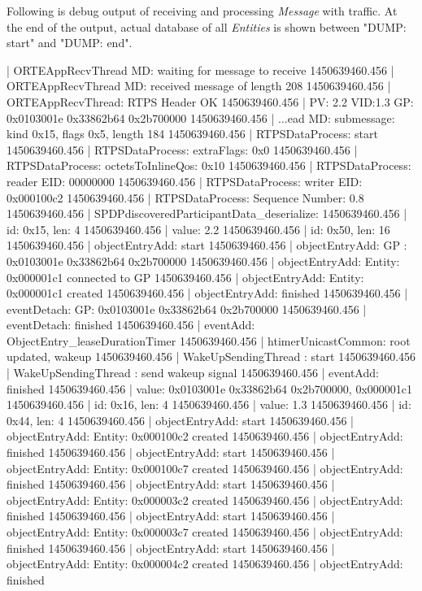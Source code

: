 Following is debug output of receiving and processing  {\em Message} with  traffic. At the end of the output, actual database of all {\em Entities} is shown between "DUMP: start" and "DUMP: end".

 | ORTEAppRecvThread MD: waiting for message to receive
1450639460.456 | ORTEAppRecvThread MD: received message of length 208
1450639460.456 | ORTEAppRecvThread: RTPS Header OK
1450639460.456 |   PV: 2.2 VID:1.3 GP: 0x0103001e 0x33862b64 0x2b700000
1450639460.456 | ...ead MD: submessage: kind 0x15, flags 0x5, length 184
1450639460.456 | RTPSDataProcess: start
1450639460.456 | RTPSDataProcess: extraFlags: 0x0
1450639460.456 | RTPSDataProcess: octetsToInlineQos: 0x10
1450639460.456 | RTPSDataProcess: reader EID:   00000000
1450639460.456 | RTPSDataProcess: writer EID: 0x000100c2
1450639460.456 | RTPSDataProcess: Sequence Number: 0.8
1450639460.456 | SPDPdiscoveredParticipantData_deserialize:
1450639460.456 |   id: 0x15, len: 4
1450639460.456 |   value: 2.2
1450639460.456 |   id: 0x50, len: 16
1450639460.456 | objectEntryAdd: start
1450639460.456 | objectEntryAdd: GP  : 0x0103001e 0x33862b64 0x2b700000
1450639460.456 | objectEntryAdd: Entity: 0x000001c1 connected to GP
1450639460.456 | objectEntryAdd: Entity: 0x000001c1 created
1450639460.456 | objectEntryAdd: finished
1450639460.456 | eventDetach: GP: 0x0103001e 0x33862b64 0x2b700000
1450639460.456 | eventDetach: finished
1450639460.456 | eventAdd: ObjectEntry_leaseDurationTimer
1450639460.456 | htimerUnicastCommon: root updated, wakeup
1450639460.456 | WakeUpSendingThread : start
1450639460.456 | WakeUpSendingThread : send wakeup signal
1450639460.456 | eventAdd: finished
1450639460.456 |   value: 0x0103001e 0x33862b64 0x2b700000, 0x000001c1
1450639460.456 |   id: 0x16, len: 4
1450639460.456 |   value: 1.3
1450639460.456 |   id: 0x44, len: 4
1450639460.456 | objectEntryAdd: start
1450639460.456 | objectEntryAdd: Entity: 0x000100c2 created
1450639460.456 | objectEntryAdd: finished
1450639460.456 | objectEntryAdd: start
1450639460.456 | objectEntryAdd: Entity: 0x000100c7 created
1450639460.456 | objectEntryAdd: finished
1450639460.456 | objectEntryAdd: start
1450639460.456 | objectEntryAdd: Entity: 0x000003c2 created
1450639460.456 | objectEntryAdd: finished
1450639460.456 | objectEntryAdd: start
1450639460.456 | objectEntryAdd: Entity: 0x000003c7 created
1450639460.456 | objectEntryAdd: finished
1450639460.456 | objectEntryAdd: start
1450639460.456 | objectEntryAdd: Entity: 0x000004c2 created
1450639460.456 | objectEntryAdd: finished
